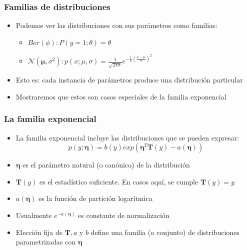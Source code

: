 \documentclass[10pt]{beamer}
\begin{document}
\begin{frame}
  \frametitle{Familias de distribuciones}
  \begin{itemize}
  \item Podemos ver las distribuciones con sus parámetros como familias:
   \begin{itemize}
   \item $Ber(\phi): P(y=1; \theta)= \theta$
   \item $\mathcal{N}(\boldsymbol{\mu}, \sigma^2): p(x; \mu , \sigma)= \frac{1}{\sqrt{2\pi \sigma}} e^{-\frac{1}{2}\left( \frac{x-\mu}{\sigma} \right)^2}$
   \end{itemize}
   \item Esto es: cada instancia de parámetros produce una distribución particular
   \item Mostraremos que estos son casos especiales de la familia exponencial 
  \end{itemize}
\end{frame}
\begin{frame}
  \frametitle{La familia exponencial}
  \begin{itemize}
  \item La familia exponencial incluye las distribuciones que se pueden expresar:
  \begin{equation*}
  p(y;\boldsymbol{\eta})= b(y)exp(\boldsymbol{\eta}^T \boldsymbol{T}(y)-a(\boldsymbol{\eta}))
  \end{equation*}
  \item $\boldsymbol{\eta}$ es el parámetro natural (o canónico) de la distribución
  \item $\boldsymbol{T}(y)$ es el estadístico suficiente. En casos aquí, se cumple $\boldsymbol{T}(y)=y$
  \item $a(\boldsymbol{\eta})$ es la función de partición logarítmica
  \item Usualmente $e^{-a(\boldsymbol{\eta})}$ es constante de normalización 
  \item Elección fija de $\boldsymbol{T}, a$ y $b$ define una familia (o conjunto) de distribuciones parametrizadas con $ \boldsymbol{\eta}$
  \end{itemize}
\end{frame}
\end{document}
